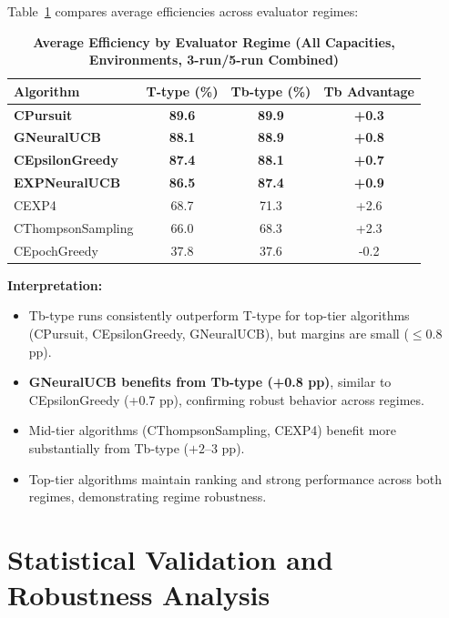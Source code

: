 \documentclass[12pt,a4paper]{article}
\newcommand{\performance}[1]{\textcolor{performancecolor}{\textbf{#1}}}
\newcommand{\legacy}[1]{\textcolor{legacycolor}{\textbf{#1}}}
\newcommand{\neural}[1]{\textcolor{neuralcolor}{\textbf{#1}}}
\begin{document}
Table~\ref{tab:regime-comparison} compares average efficiencies across evaluator regimes:

\begin{table}[H]
\centering
\caption{\performance{Average Efficiency by Evaluator Regime (All Capacities, Environments, 3-run/5-run Combined)}}
\label{tab:regime-comparison}
\begin{tabular}{|l|c|c|c|}
\hline
\textbf{Algorithm} & \textbf{T-type (\%)} & \textbf{Tb-type (\%)} & \textbf{Tb Advantage} \\
\hline
\hline
\performance{CPursuit}        & \performance{89.6} & \performance{89.9} & \performance{+0.3} \\
\neural{GNeuralUCB}          & \neural{88.1} & \neural{88.9} & \neural{+0.8} \\
\performance{CEpsilonGreedy} & \performance{87.4} & \performance{88.1} & \performance{+0.7} \\
\legacy{EXPNeuralUCB}        & \legacy{86.5}     & \legacy{87.4}     & \legacy{+0.9} \\
CEXP4                        & 68.7              & 71.3              & +2.6 \\
CThompsonSampling            & 66.0              & 68.3              & +2.3 \\
CEpochGreedy                 & 37.8              & 37.6              & -0.2 \\
\hline
\end{tabular}
\end{table}

\textbf{Interpretation:}
\begin{itemize}
\item Tb-type runs consistently outperform T-type for top-tier algorithms (CPursuit, CEpsilonGreedy, GNeuralUCB), but margins are small ($\leq$0.8 pp).
\item \neural{GNeuralUCB benefits from Tb-type (+0.8 pp)}, similar to CEpsilonGreedy (+0.7 pp), confirming robust behavior across regimes.
\item Mid-tier algorithms (CThompsonSampling, CEXP4) benefit more substantially from Tb-type ($+2$--3 pp).
\item Top-tier algorithms maintain ranking and strong performance across both regimes, demonstrating regime robustness.
\end{itemize}

\section{Statistical Validation and Robustness Analysis}
\end{document}
